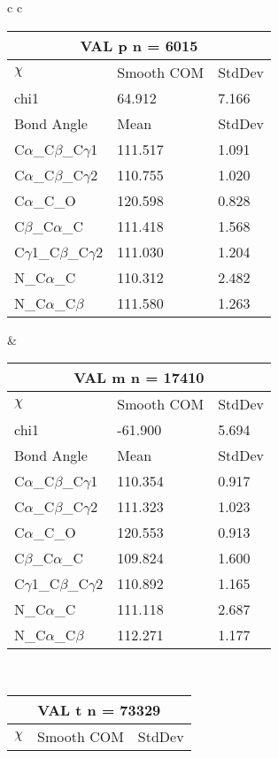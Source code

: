 \begin{longtable}{ c c }

  \begin{tabular}{ l l l }
  \toprule
  \multicolumn{3}{c}{VAL \textbf{p} n = 6015} \\ \toprule
  $\chi$       & Smooth COM & StdDev \\ \midrule
  chi1 & 64.912 & 7.166 \\ \midrule
  Bond Angle   & Mean     & StdDev \\ \midrule
  C$\alpha$\_C$\beta$\_C$\gamma$1 & 111.517 & 1.091\\
  C$\alpha$\_C$\beta$\_C$\gamma$2 & 110.755 & 1.020\\
  C$\alpha$\_C\_O & 120.598 & 0.828\\
  C$\beta$\_C$\alpha$\_C & 111.418 & 1.568\\
  C$\gamma$1\_C$\beta$\_C$\gamma$2 & 111.030 & 1.204\\
  N\_C$\alpha$\_C & 110.312 & 2.482\\
  N\_C$\alpha$\_C$\beta$ & 111.580 & 1.263\\
  \bottomrule
  \end{tabular}
  &
  \begin{tabular}{ l l l }
  \toprule
  \multicolumn{3}{c}{VAL \textbf{m} n = 17410} \\ \toprule
  $\chi$       & Smooth COM & StdDev \\ \midrule
  chi1 & -61.900 & 5.694 \\ \midrule
  Bond Angle   & Mean     & StdDev \\ \midrule
  C$\alpha$\_C$\beta$\_C$\gamma$1 & 110.354 & 0.917\\
  C$\alpha$\_C$\beta$\_C$\gamma$2 & 111.323 & 1.023\\
  C$\alpha$\_C\_O & 120.553 & 0.913\\
  C$\beta$\_C$\alpha$\_C & 109.824 & 1.600\\
  C$\gamma$1\_C$\beta$\_C$\gamma$2 & 110.892 & 1.165\\
  N\_C$\alpha$\_C & 111.118 & 2.687\\
  N\_C$\alpha$\_C$\beta$ & 112.271 & 1.177\\
  \bottomrule
  \end{tabular}
  \\
  \begin{tabular}{ l l l }
  \toprule
  \multicolumn{3}{c}{VAL \textbf{t} n = 73329} \\ \toprule
  $\chi$       & Smooth COM & StdDev \\ \midrule

\end{tabular}
\end{longtable}
